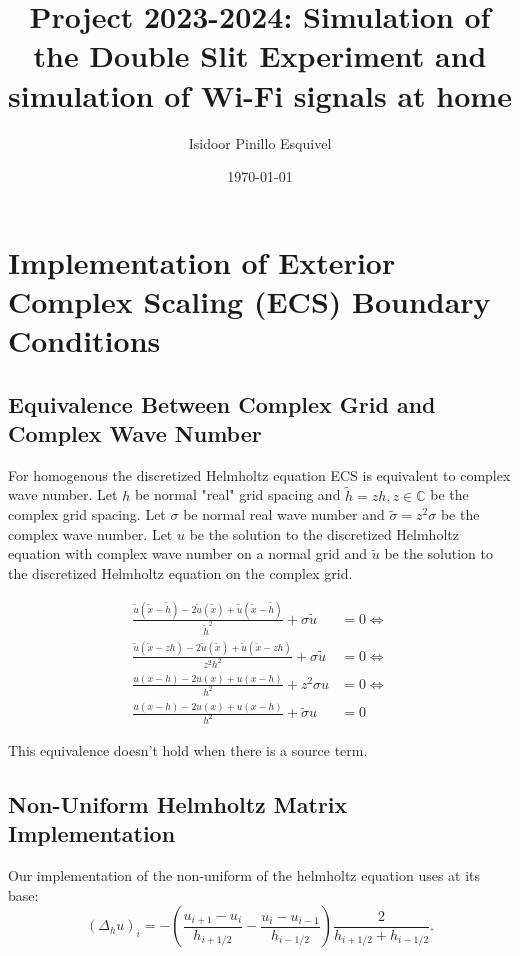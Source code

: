\documentclass[a4paper,12pt]{article}
\begin{document}
\title{Project 2023-2024: Simulation of the Double Slit Experiment
    and simulation of Wi-Fi signals at home}
\author{Isidoor Pinillo Esquivel}
\date{\today}
\maketitle


\section{Implementation of Exterior Complex Scaling (ECS) Boundary Conditions}
\subsection{Equivalence Between Complex Grid and Complex Wave Number}

For homogenous the discretized Helmholtz equation ECS is equivalent to
complex wave number. Let $h$ be normal "real" grid spacing and $\tilde{h} = z h, z \in \mathbb{C} $
be the complex grid spacing.
Let $\sigma$ be normal real wave number and $\tilde{\sigma} = z^{2} \sigma$ be the complex wave number.
Let $u$ be the solution to the discretized Helmholtz equation with complex wave number on a normal grid
and $\tilde{u}$ be the solution to the discretized Helmholtz equation on the complex grid.

\begin{align}
    \frac{\tilde{u}(\tilde{x}-\tilde{h}) -2 \tilde{u}(\tilde{x}) + \tilde{u}(\tilde{x} - \tilde{h})}{\tilde{h}^2} + \sigma \tilde{u} & = 0  \Leftrightarrow \\
    \frac{\tilde{u}(\tilde{x}-zh) -2 \tilde{u}(\tilde{x}) + \tilde{u}(\tilde{x} - zh)}{z^{2}h^2} + \sigma \tilde{u}                  & = 0  \Leftrightarrow \\
    \frac{u(x-h) -2 u(x) + u(x - h)}{h^2} + z^{2} \sigma u                                                                           & = 0  \Leftrightarrow \\
    \frac{u(x-h) -2 u(x) + u(x - h)}{h^2} + \tilde{\sigma} u                                                                         & = 0
\end{align}

This equivalence doesn't hold when there is a source term.

\subsection{Non-Uniform Helmholtz Matrix Implementation}
Our implementation of the non-uniform of the helmholtz equation uses at its base:
$$
    (\Delta_{h}u)_{i} = -\left( \frac{u_{i+1} - u_{i}}{h_{i+1/2}} - \frac{u_{i} - u_{i-1}}{h_{i-1/2}} \right) \frac{2}{h_{i+1/2} +h_{i-1/2}}
    .
$$
\end{document}
